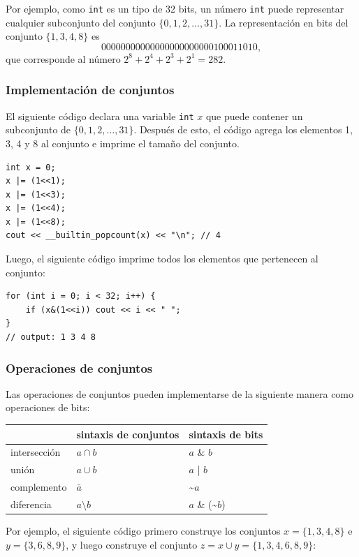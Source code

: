 Por ejemplo, como \texttt{int} es un tipo de 32 bits,
un número \texttt{int} puede representar cualquier subconjunto
del conjunto $\{0,1,2,\ldots,31\}$.
La representación en bits del conjunto $\{1,3,4,8\}$ es
\[00000000000000000000000100011010,\]
que corresponde al número $2^8+2^4+2^3+2^1=282$.

\subsubsection{Implementación de conjuntos}

El siguiente código declara una variable
\texttt{int} $x$ que puede contener
un subconjunto de $\{0,1,2,\ldots,31\}$.
Después de esto, el código agrega los elementos 1, 3, 4 y 8
al conjunto e imprime el tamaño del conjunto.
\begin{lstlisting}
int x = 0;
x |= (1<<1);
x |= (1<<3);
x |= (1<<4);
x |= (1<<8);
cout << __builtin_popcount(x) << "\n"; // 4
\end{lstlisting}
Luego, el siguiente código imprime todos los
elementos que pertenecen al conjunto:
\begin{lstlisting}
for (int i = 0; i < 32; i++) {
    if (x&(1<<i)) cout << i << " ";
}
// output: 1 3 4 8
\end{lstlisting}

\subsubsection{Operaciones de conjuntos}

Las operaciones de conjuntos pueden implementarse de la siguiente manera como operaciones de bits:

\begin{center}
\begin{tabular}{lll}
& sintaxis de conjuntos & sintaxis de bits \\
\hline
intersección & $a \cap b$ & $a$ \& $b$ \\
unión & $a \cup b$ & $a$ | $b$ \\
complemento & $\bar a$ & \textasciitilde$a$ \\
diferencia & $a \setminus b$ & $a$ \& (\textasciitilde$b$) \\
\end{tabular}
\end{center}

Por ejemplo, el siguiente código primero construye
los conjuntos $x=\{1,3,4,8\}$ e $y=\{3,6,8,9\}$,
y luego construye el conjunto $z = x \cup y = \{1,3,4,6,8,9\}$:

